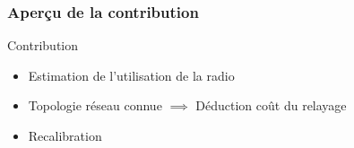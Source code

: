\begin{frame}\frametitle{Aperçu de la contribution}


  \begin{figure}
    \centering
    
  \end{figure}


  \begin{alertblock}{Contribution}
    \begin{itemize}
      \item Estimation de l'utilisation de la radio
      \item Topologie réseau connue $\implies$ Déduction coût du relayage
      \item Recalibration
    \end{itemize}
  \end{alertblock}

\end{frame}


